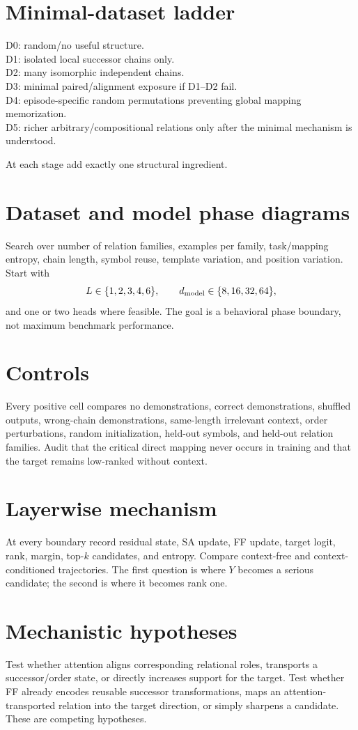 \documentclass[10pt]{article}
\begin{document}
\section{Minimal-dataset ladder}
D0: random/no useful structure.\\
D1: isolated local successor chains only.\\
D2: many isomorphic independent chains.\\
D3: minimal paired/alignment exposure if D1--D2 fail.\\
D4: episode-specific random permutations preventing global mapping memorization.\\
D5: richer arbitrary/compositional relations only after the minimal mechanism is understood.

At each stage add exactly one structural ingredient.

\section{Dataset and model phase diagrams}
Search over number of relation families, examples per family, task/mapping entropy, chain length, symbol reuse, template variation, and position variation. Start with
\[
L\in\{1,2,3,4,6\},\qquad d_{\rm model}\in\{8,16,32,64\},
\]
and one or two heads where feasible. The goal is a behavioral phase boundary, not maximum benchmark performance.

\section{Controls}
Every positive cell compares no demonstrations, correct demonstrations, shuffled outputs, wrong-chain demonstrations, same-length irrelevant context, order perturbations, random initialization, held-out symbols, and held-out relation families. Audit that the critical direct mapping never occurs in training and that the target remains low-ranked without context.

\section{Layerwise mechanism}
At every boundary record residual state, SA update, FF update, target logit, rank, margin, top-$k$ candidates, and entropy. Compare context-free and context-conditioned trajectories. The first question is where \(Y\) becomes a serious candidate; the second is where it becomes rank one.

\section{Mechanistic hypotheses}
Test whether attention aligns corresponding relational roles, transports a successor/order state, or directly increases support for the target. Test whether FF already encodes reusable successor transformations, maps an attention-transported relation into the target direction, or simply sharpens a candidate. These are competing hypotheses.
\end{document}
